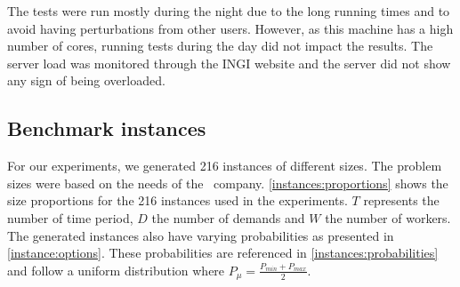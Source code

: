 \documentclass[../../thesis.tex]{subfiles}
\begin{document}
The tests were run mostly during the night due to the long running times and to avoid having 
perturbations from other users. However, as this machine has a high number of cores, running tests 
during the day did not impact the results. 
The server load was monitored through the INGI website \cite{jabba:monitoring} and the server did not show any sign of being overloaded.

\subsection{Benchmark instances}

For our experiments, we generated 216 instances of different sizes. The problem sizes were based on the needs of the \vone\ company.
\autoref{instances:proportions} shows the size proportions for the 216 instances used in the experiments. $T$ represents the number of time period, $D$ the number of demands and $W$ the number of workers. The generated instances also have varying probabilities as presented in \autoref{instance:options}. These probabilities are referenced in \autoref{instances:probabilities} and follow a uniform distribution where $P_{\mu} = \frac{P_{min} + P_{max}}{2}$.
\end{document}
